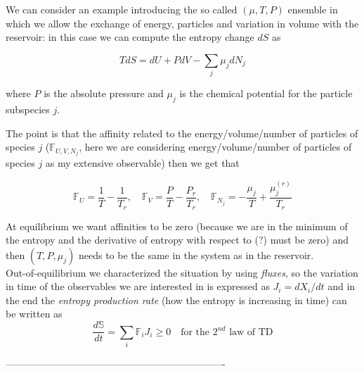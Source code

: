 \documentclass[\main/main.tex]{subfiles}
\begin{document}
We can consider an example introducing the so called $(\mu,T,P)$ ensemble in which we allow the exchange of energy, particles and variation in volume with the reservoir: in this case we can compute the entropy change $dS$ as

\begin{equation}
T d S=d U+P d V-\sum_{j} \mu_{j} d N_{j} 
\label{eq:gibbs2}
\end{equation}

where $P$ is the absolute pressure and $\mu_j$ is the chemical potential for the particle subspecies $j$.

The point is that the affinity related to the energy/volume/number of particles of species $j$ ($\mathbb{F}_{U,V,N_j}$, here we are considering energy/volume/number of particles of species $j$ as my extensive observable) then we get that

\begin{equation}
    \mathbb{F}_{U}=\frac{1}{T}-\frac{1}{T_{r}}, \quad \mathbb{F}_{V}=\frac{P}{T}-\frac{P_{r}}{T_{r}}, \quad \mathbb{F}_{N_{j}}=-\frac{\mu_{j}}{T}+\frac{\mu_{j}^{(r)}}{T_{r}}
\end{equation}

At equilibrium  we want affinities to be zero (because we are in the minimum of the entropy and the derivative of entropy with respect to (?) must be zero) and then $(T,P,\mu_j)$ needs to be the same in the system as in the reservoir. \\

Out-of-equilibrium we characterized the situation by using \textit{fluxes}, so the variation in time of the observables we are interested in is expressed as $J_i=dX_i/dt$ and in the end the \textit{entropy production rate} (how the entropy is increasing in time) can be written as
\begin{equation}
    \frac{d\mathbb{S}}{dt}=\sum_i\mathbb{F}_iJ_i\geq 0 \quad \text{for the 2$^{nd}$ law of TD}
    \label{eq:2l}
\end{equation}

\begin{center}
    -------------------------------------------------------------------
\end{center}
\end{document}
